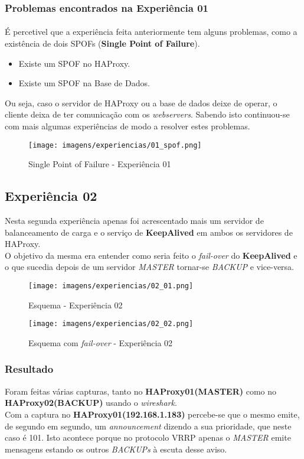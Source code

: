 \documentclass{report}
\begin{document}
\subsubsection{Problemas encontrados na Experiência 01}
\paragraph{}
É percetivel que a experiência feita anteriormente tem alguns problemas, como a existência de dois SPOFs (\textbf{Single Point of Failure}).
\begin{itemize}
  \item Existe um SPOF no HAProxy.
  \item Existe um SPOF na Base de Dados.
\end{itemize}
Ou seja, caso o servidor de HAProxy ou a base de dados deixe de operar, o cliente deixa de ter comunicação com os \emph{webservers}. Sabendo isto continuou-se com mais algumas experiências de modo a resolver estes problemas.

\begin{figure}[H]
\center
\texttt{[image: imagens/experiencias/01\_spof.png]}
\caption{Single Point of Failure - Experiência 01}
\label{fig.nav}
\end{figure}


\subsection{Experiência 02}
Nesta segunda experiência apenas foi acrescentado mais um servidor de balanceamento de carga e o serviço de \textbf{KeepAlived} em ambos os servidores de HAProxy.\\
O objetivo da mesma era entender como seria feito o \emph{fail-over} do \textbf{KeepAlived} e o que sucedia depois de um servidor \emph{MASTER} tornar-se \emph{BACKUP} e vice-versa.

\begin{figure}[H]
\center
\texttt{[image: imagens/experiencias/02\_01.png]}
\caption{Esquema - Experiência 02}
\label{fig.nav}
\end{figure}

\begin{figure}[H]
\center
\texttt{[image: imagens/experiencias/02\_02.png]}
\caption{Esquema com \emph{fail-over} - Experiência 02}
\label{fig.nav}
\end{figure}


\subsubsection{Resultado}
Foram feitas várias capturas, tanto no \textbf{HAProxy01(MASTER)} como no \textbf{HAProxy02(BACKUP)} usando o \emph{wireshark}.\\
Com a captura no \textbf{HAProxy01(192.168.1.183)} percebe-se que o mesmo emite, de segundo em segundo, um \emph{announcement} dizendo a sua prioridade, que neste caso é 101. Isto acontece porque no protocolo VRRP apenas o \emph{MASTER} emite mensagens estando os outros \emph{BACKUPs} à escuta desse aviso.
\end{document}
